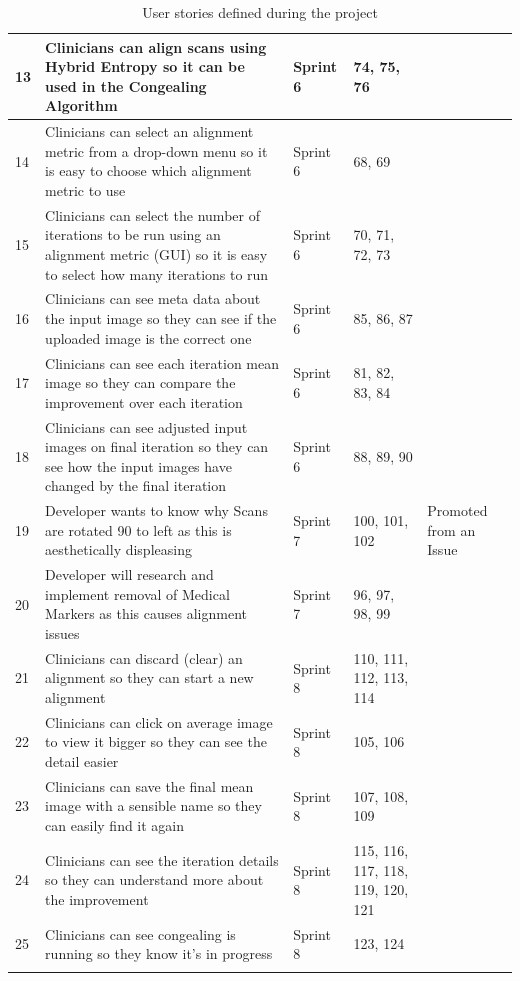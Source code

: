 \begin{center}
\begin{longtable}{| p{2cm} | p{4cm} | p{2cm}  | p{2cm} | p{3cm} |}
      13 & Clinicians can align scans using Hybrid Entropy so it can be used in the Congealing Algorithm  & Sprint 6 & 74, 75, 76 & \\ \hline
      14 & Clinicians can select an alignment metric from a drop-down menu so it is easy to choose which alignment metric to use & Sprint 6 & 68, 69 & \\ \hline
      15 & Clinicians can select the number of iterations to be run using an alignment metric (GUI) so it is easy to select how many iterations to run & Sprint 6 & 70, 71, 72, 73 & \\ \hline
      16 & Clinicians can see meta data about the input image so they can see if the uploaded image is the correct one & Sprint 6 & 85, 86, 87 & \\ \hline
      17 & Clinicians can see each iteration mean image so they can compare the improvement over each iteration & Sprint 6 & 81, 82, 83, 84 & \\ \hline
      18 & Clinicians can see adjusted input images on final iteration so they can see how the input images have changed by the final iteration & Sprint 6 & 88, 89, 90 & \\ \hline
      19 & Developer wants to know why Scans are rotated 90 to left as this is aesthetically displeasing & Sprint 7 & 100, 101, 102 & Promoted from an Issue \\ \hline
      20 & Developer will research and implement removal of Medical Markers as this causes alignment issues & Sprint 7 & 96, 97, 98, 99 & \\ \hline
      21 & Clinicians can discard (clear) an alignment so they can start a new alignment & Sprint 8 & 110, 111, 112, 113, 114 & \\ \hline
      22 & Clinicians can click on average image to view it bigger so they can see the detail easier & Sprint 8 & 105, 106 & \\ \hline
      23 & Clinicians can save the final mean image with a sensible name so they can easily find it again & Sprint 8 & 107, 108, 109 & \\ \hline
      24 & Clinicians can see the iteration details so they can understand more about the improvement & Sprint 8 & 115, 116, 117, 118, 119, 120, 121 & \\ \hline
      25 & Clinicians can see congealing is running so they know it's in progress & Sprint 8 & 123, 124 & \\ \hline
  \caption{User stories defined during the project}
  \label{table:User Stories}
\end{longtable}
\end{center}

